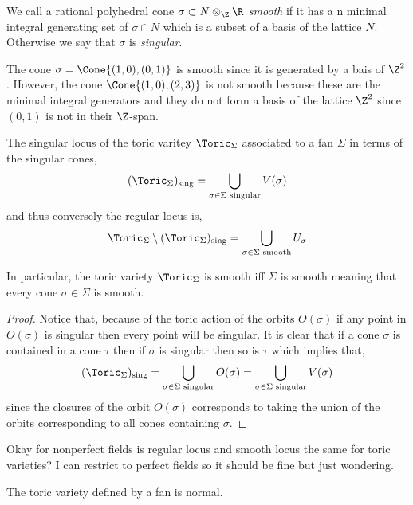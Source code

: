 \documentclass[12pt]{article}
\begin{document}
\begin{defn}
We call a rational polyhedral cone $\sigma \subset N \otimes_\Z \R$ \textit{smooth} if it has a n minimal integral generating set of $\sigma \cap N$ which is a subset of a basis of the lattice $N$. Otherwise we say that $\sigma$ is \textit{singular}.
\end{defn}


\begin{example}
The cone $\sigma = \Cone{(1, 0), (0, 1)}$ is smooth since it is generated by a bais of $\Z^2$. However, the cone $\Cone{(1, 0), (2, 3)}$ is not smooth because these are the minimal integral generators and they do not form a basis of the lattice $\Z^2$ since $(0, 1)$ is not in their $\Z$-span.
\end{example}

\begin{lemma}
The singular locus of the toric varitey $\Toric_\Sigma$ associated to a fan $\Sigma$ in terms of the singular cones,
\[ (\Toric_\Sigma)_{\text{sing}} = \bigcup_{\sigma \in \Sigma \text{ singular}} V(\sigma) \]
and thus conversely the regular locus is,
\[ \Toric_{\Sigma} \setminus (\Toric_\Sigma)_{\text{sing}} = \bigcup_{\sigma \in \Sigma \text{ smooth}} U_\sigma \] 
\end{lemma}
\noindent
In particular, the toric variety $\Toric_\Sigma$ is smooth iff $\Sigma$ is smooth meaning that every cone $\sigma \in \Sigma$ is smooth. 

\begin{proof}
Notice that, because of the toric action of the orbits $O(\sigma)$ if any point in $O(\sigma)$ is singular then every point will be singular. It is clear that if a cone $\sigma$ is contained in a cone $\tau$ then if $\sigma$ is singular then so is $\tau$ which implies that,
\[ (\Toric_\Sigma)_{\text{sing}} = \bigcup_{\sigma \in \Sigma \text{ singular}} O(\sigma) = \bigcup_{\sigma \in \Sigma \text{ singular}} V(\sigma) \]
since the closures of the orbit $O(\sigma)$ corresponds to taking the union of the orbits corresponding to all cones containing $\sigma$. 
\end{proof}

\begin{question}
Okay for nonperfect fields is regular locus and smooth locus the same for toric varieties? I can restrict to perfect fields so it should be fine but just wondering.
\end{question}

\begin{prop}
The toric variety defined by a fan is normal. 
\end{prop}
\end{document}
